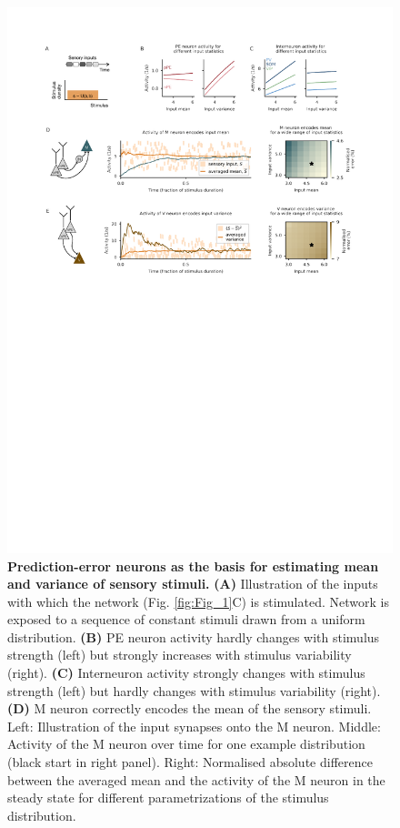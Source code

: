 \documentclass[10pt,a4paper,draft]{article}
\begin{document}
\begin{figure}[t!]
	\centering
    \includegraphics[width=1\linewidth]{../results/figures/final/Fig_2}
\caption{\footnotesize{\bf Prediction-error neurons as the basis for estimating mean and variance of sensory stimuli.\newline} 
{\bf (A)} Illustration of the inputs with which the network (Fig. \ref{fig:Fig_1}C) is stimulated. Network is exposed to a sequence of constant stimuli drawn from a uniform distribution.
{\bf (B)} PE neuron activity hardly changes with stimulus strength (left) but strongly increases with stimulus variability (right).
{\bf (C)} Interneuron activity strongly changes with stimulus strength (left) but hardly changes with stimulus variability (right).
{\bf (D)} M neuron correctly encodes the mean of the sensory stimuli. Left: Illustration of the input synapses onto the M neuron. Middle: Activity of the M neuron over time for one example distribution (black start in right panel). Right: Normalised absolute difference between the averaged mean and the activity of the M neuron in the steady state for different parametrizations of the stimulus distribution.
}
\end{figure}
\end{document}
